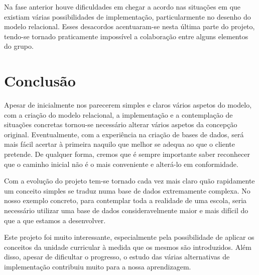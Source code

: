 \documentclass[12pt,a4paper,reqno]{report}
\numberwithin{figure}{section}
\numberwithin{equation}{section}
\begin{document}
Na fase anterior houve dificuldades em chegar a acordo nas situações em que existiam várias possibilidades de implementação, particularmente no desenho do modelo relacional. Esses desacordos acentuaram-se nesta última parte do projeto, tendo-se tornado praticamente impossível a colaboração entre alguns elementos do grupo.

\chapter{Conclusão}

Apesar de inicialmente nos parecerem simples e claros vários aspetos do modelo, com a criação do modelo relacional, a implementação e a contemplação de situações concretas tornou-se necessário alterar vários aspetos da concepção original. Eventualmente, com a experiência na criação de bases de dados, será mais fácil acertar à primeira naquilo que melhor se adequa ao que o cliente pretende. De qualquer forma, cremos que é sempre importante saber reconhecer que o caminho inicial não é o mais conveniente e alterá-lo em conformidade.

Com a evolução do projeto tem-se tornado cada vez mais claro quão rapidamente um conceito simples se traduz numa base de dados extremamente complexa. No nosso exemplo concreto, para contemplar toda a realidade de uma escola, seria necessário utilizar uma base de dados consideravelmente maior e mais difícil do que a que estamos a desenvolver.

Este projeto foi muito interessante, especialmente pela possibilidade de aplicar os conceitos da unidade curricular à medida que os mesmos são introduzidos. Além disso, apesar de dificultar o progresso, o estudo das várias alternativas de implementação contribuiu muito para a nossa aprendizagem.
\end{document}

